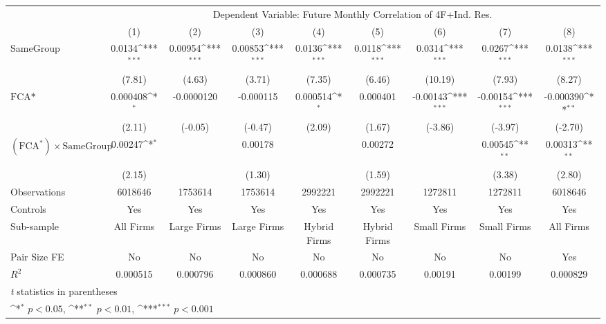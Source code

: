{
\def\sym#1{\ifmmode^{#1}\else\(^{#1}\)\fi}
\begin{tabular}{l*{8}{c}}
\hline\hline
                &\multicolumn{8}{c}{Dependent Variable: Future Monthly Correlation of 4F+Ind. Res.}                                                                     \\\cmidrule(lr){2-9}
                &\multicolumn{1}{c}{(1)}         &\multicolumn{1}{c}{(2)}         &\multicolumn{1}{c}{(3)}         &\multicolumn{1}{c}{(4)}         &\multicolumn{1}{c}{(5)}         &\multicolumn{1}{c}{(6)}         &\multicolumn{1}{c}{(7)}         &\multicolumn{1}{c}{(8)}         \\
\hline
SameGroup       &   0.0134\sym{***}&  0.00954\sym{***}&  0.00853\sym{***}&   0.0136\sym{***}&   0.0118\sym{***}&   0.0314\sym{***}&   0.0267\sym{***}&   0.0138\sym{***}\\
                &   (7.81)         &   (4.63)         &   (3.71)         &   (7.35)         &   (6.46)         &  (10.19)         &   (7.93)         &   (8.27)         \\
[1em]
$ \text{FCA*} $ & 0.000408\sym{*}  &-0.0000120         &-0.000115         & 0.000514\sym{*}  & 0.000401         & -0.00143\sym{***}& -0.00154\sym{***}&-0.000390\sym{**} \\
                &   (2.11)         &  (-0.05)         &  (-0.47)         &   (2.09)         &   (1.67)         &  (-3.86)         &  (-3.97)         &  (-2.70)         \\
[1em]
 $ (\text{FCA}^*) \times {\text{SameGroup} }  $ &  0.00247\sym{*}  &                  &  0.00178         &                  &  0.00272         &                  &  0.00545\sym{**} &  0.00313\sym{**} \\
                &   (2.15)         &                  &   (1.30)         &                  &   (1.59)         &                  &   (3.38)         &   (2.80)         \\
\hline
Observations    &  6018646         &  1753614         &  1753614         &  2992221         &  2992221         &  1272811         &  1272811         &  6018646         \\
Controls        &      Yes         &      Yes         &      Yes         &      Yes         &      Yes         &      Yes         &      Yes         &      Yes         \\
Sub-sample      &All Firms         &Large Firms         &Large Firms         &Hybrid Firms         &Hybrid Firms         &Small Firms         &Small Firms         &All Firms         \\
Pair Size FE    &       No         &       No         &       No         &       No         &       No         &       No         &       No         &      Yes         \\
$ R^2 $         & 0.000515         & 0.000796         & 0.000860         & 0.000688         & 0.000735         &  0.00191         &  0.00199         & 0.000829         \\
\hline\hline
\multicolumn{9}{l}{\footnotesize \textit{t} statistics in parentheses}\\
\multicolumn{9}{l}{\footnotesize \sym{*} \(p<0.05\), \sym{**} \(p<0.01\), \sym{***} \(p<0.001\)}\\
\end{tabular}
}

